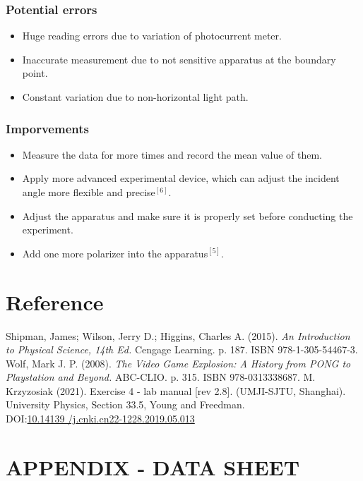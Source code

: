 \documentclass[a4paper]{article}
\begin{document}
\subsubsection{Potential errors}

\begin{itemize}
	\item Huge reading errors due to variation of photocurrent meter.
	\item Inaccurate measurement due to not sensitive apparatus at the boundary point.
	\item Constant variation due to non-horizontal light path.
\end{itemize}

\subsubsection{Imporvements}

\begin{itemize}
	\item Measure the data for more times and record the mean value of them.
	\item Apply more advanced experimental device, which can adjust the incident angle more flexible and precise$^{[6]}$.
	\item Adjust the apparatus and make sure it is properly set before conducting the experiment.
	\item Add one more polarizer into the apparatus$^{[5]}$.
\end{itemize}



\newpage
\section{Reference}
\noindent [1] Shipman, James; Wilson, Jerry D.; Higgins, Charles A. (2015). \textit{An Introduction to Physical Science, 14th Ed.} Cengage Learning. p. 187. ISBN 978-1-305-54467-3. \\
\noindent [2] Wolf, Mark J. P. (2008). \textit{The Video Game Explosion: A History from PONG to Playstation and Beyond.} ABC-CLIO. p. 315. ISBN 978-0313338687.
\noindent [3] M. Krzyzosiak (2021). Exercise 4 - lab manual [rev 2.8]. (UMJI-SJTU, Shanghai). \\
\noindent [4] University Physics, Section 33.5, Young and Freedman. \\ 
\noindent [5] DOI:\url{10.14139 /j.cnki.cn22-1228.2019.05.013}


\newpage
\section*{APPENDIX - DATA SHEET}






\end{document}
